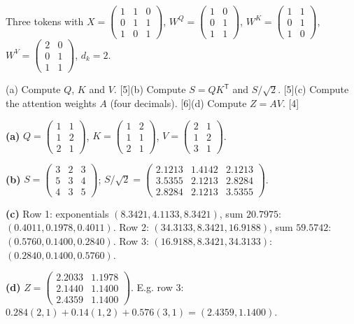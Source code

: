 \documentclass[11pt]{article}
\begin{document}
\begin{prob}Three tokens with $X=\begin{pmatrix}1&1&0\\0&1&1\\1&0&1\end{pmatrix}$, $W^Q=\begin{pmatrix}1&0\\0&1\\1&1\end{pmatrix}$, $W^K=\begin{pmatrix}1&1\\0&1\\1&0\end{pmatrix}$, $W^V=\begin{pmatrix}2&0\\0&1\\1&1\end{pmatrix}$, $d_k=2$.

(a) Compute $Q$, $K$ and $V$. [5]\newline (b) Compute $S=QK^{\mathsf T}$ and $S/\sqrt2$. [5]\newline (c) Compute the attention weights $A$ (four decimals). [6]\newline (d) Compute $Z=AV$. [4]\end{prob}

\begin{soln}\textbf{(a)} $Q=\begin{pmatrix}1&1\\1&2\\2&1\end{pmatrix}$, $K=\begin{pmatrix}1&2\\1&1\\2&1\end{pmatrix}$, $V=\begin{pmatrix}2&1\\1&2\\3&1\end{pmatrix}$.

\textbf{(b)} $S=\begin{pmatrix}3&2&3\\5&3&4\\4&3&5\end{pmatrix}$; $S/\sqrt2=\begin{pmatrix}2.1213&1.4142&2.1213\\3.5355&2.1213&2.8284\\2.8284&2.1213&3.5355\end{pmatrix}$.

\textbf{(c)} Row 1: exponentials $(8.3421,4.1133,8.3421)$, sum $20.7975$: $(0.4011,0.1978,0.4011)$. Row 2: $(34.3133,8.3421,16.9188)$, sum $59.5742$: $(0.5760,0.1400,0.2840)$. Row 3: $(16.9188,8.3421,34.3133)$: $(0.2840,0.1400,0.5760)$.

\textbf{(d)} $Z=\begin{pmatrix}2.2033&1.1978\\2.1440&1.1400\\2.4359&1.1400\end{pmatrix}$. E.g. row 3: $0.284(2,1)+0.14(1,2)+0.576(3,1)=(2.4359,1.1400)$.\end{soln}
\end{document}

